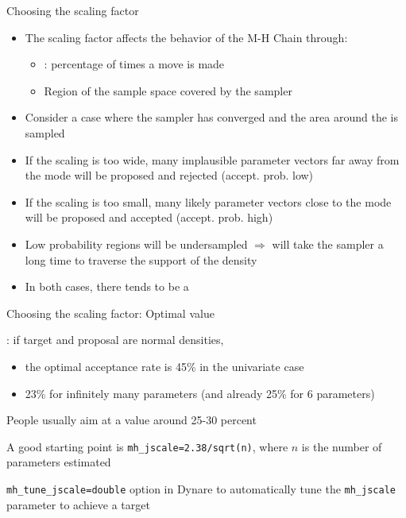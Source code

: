 \begin{frame}{Choosing the scaling factor}
\begin{itemize}
    \item The scaling factor affects the behavior of the M-H Chain through:
    \begin{itemize}
      \item {}: percentage of times a move is made
      \item Region of the sample space covered by the sampler
    \end{itemize}
    \item Consider a case where the sampler has converged and the area around the  is sampled
    \item If the scaling is too wide, many implausible parameter vectors far away from the mode will be proposed and rejected (accept. prob. low)
    \item If the scaling is too small, many likely parameter vectors close to the mode will be proposed and accepted (accept. prob. high)
    \item Low probability regions will be undersampled $\Rightarrow$ will take the sampler a long time to traverse the support of the density
    \item In both cases, there tends to be a 
\end{itemize}
\end{frame}

\begin{frame}{Choosing the scaling factor: Optimal value}
\begin{witemize}
    \item \textcite{Robertsetal1997}: if target and proposal are normal densities,
    \begin{itemize}
      \item the optimal acceptance rate is 45\% in the univariate case
      \item 23\% for infinitely many parameters (and already 25\% for 6 parameters)
    \end{itemize}
    \item People usually aim at a value around 25-30 percent
    \item A good starting point is \texttt{mh\_jscale=2.38/sqrt(n)}, where $n$ is the number of parameters estimated
    \item \texttt{mh\_tune\_jscale=double} option in Dynare to automatically tune the \texttt{mh\_jscale} parameter to achieve a target
\end{witemize}
\end{frame}


